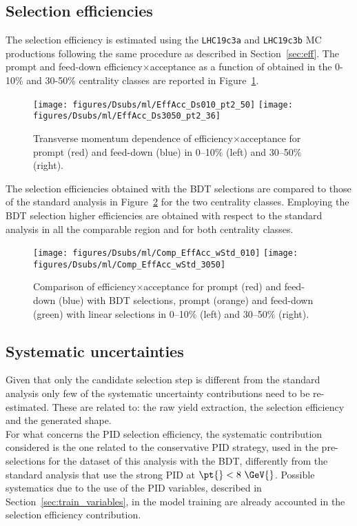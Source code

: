 \subsection{Selection efficiencies}
The selection efficiency is estimated using the \texttt{LHC19c3a} and \texttt{LHC19c3b} MC productions following the same 
procedure as described in Section~\ref{sec:eff}. 
The prompt and feed-down efficiency$\times$acceptance as a function of \pt{} obtained in the 0-10\% and 30-50\% centrality classes 
are reported in Figure~\ref{fig:eff_tot}.
\begin{figure}[htbp]
  \begin{center}
   \texttt{[image: figures/Dsubs/ml/EffAcc\_Ds010\_pt2\_50]}
   \texttt{[image: figures/Dsubs/ml/EffAcc\_Ds3050\_pt2\_36]} 
  \caption{Transverse momentum dependence of efficiency$\times$acceptance for prompt (red) 
           and feed-down (blue) \Dsubs in 0--10$\%$ (left) and 30--50$\%$ (right).}
  \label{fig:eff_tot}
  \end{center}
\end{figure}
The selection efficiencies obtained with the BDT selections are compared to those of the standard analysis in Figure~\ref{fig:eff_comp} 
for the two centrality classes. Employing the BDT selection higher efficiencies are obtained with respect to the standard analysis in all 
the comparable \pt{} region and for both centrality classes.
\begin{figure}[htbp]
  \begin{center}
   \texttt{[image: figures/Dsubs/ml/Comp\_EffAcc\_wStd\_010]}
   \texttt{[image: figures/Dsubs/ml/Comp\_EffAcc\_wStd\_3050]} 
  \caption{Comparison of efficiency$\times$acceptance for prompt (red) and feed-down (blue) \Dsubs{} with BDT selections, 
           prompt (orange) and feed-down (green) \Dsubs{} with linear selections in 0--10$\%$ (left) and 30--50$\%$ (right).}
  \label{fig:eff_comp}
  \end{center}
\end{figure}

\clearpage

\subsection{Systematic uncertainties}
Given that only the candidate selection step is different from the standard analysis only few of the 
systematic uncertainty contributions need to be re-estimated. These are related to: the raw yield extraction, 
the selection efficiency and the generated \pt{} shape. \\ 
For what concerns the PID selection efficiency, the systematic 
contribution considered is the one related to the conservative PID strategy, used in the pre-selections for the 
dataset of this analysis with the BDT, differently from the standard analysis that use the strong PID at 
\(\pt{} < 8~\GeV{}\). Possible systematics due to the use of the PID variables, described in Section~\ref{sec:train_variables},
in the model training are already accounted in the selection efficiency contribution.
 
